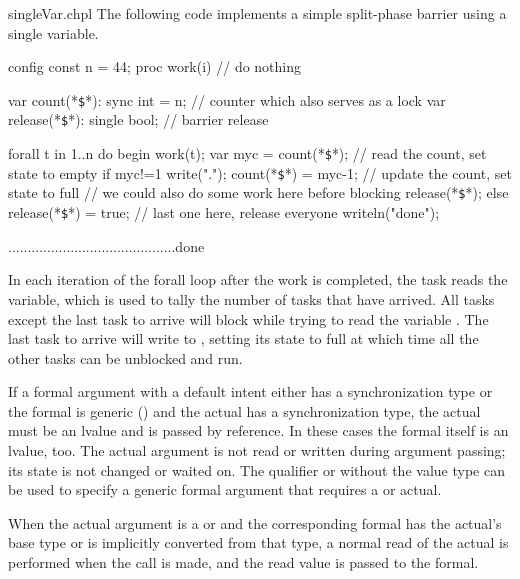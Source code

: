 \pagebreak
\begin{chapelexample}{singleVar.chpl}
The following code implements a simple split-phase barrier using a
single variable.
\begin{chapelpre}
config const n = 44;
proc work(i) {
  // do nothing
}
\end{chapelpre}
\begin{chapel}
var count(*\texttt{\$}*): sync int = n;  // counter which also serves as a lock
var release(*\texttt{\$}*): single bool; // barrier release

forall t in 1..n do begin {
  work(t);
  var myc = count(*\texttt{\$}*);  // read the count, set state to empty
  if myc!=1 {
    write(".");
    count(*\texttt{\$}*) = myc-1;  // update the count, set state to full
    // we could also do some work here before blocking
    release(*\texttt{\$}*);
  } else {
    release(*\texttt{\$}*) = true;  // last one here, release everyone
    writeln("done");
  }
}
\end{chapel}
\begin{chapeloutput}
...........................................done
\end{chapeloutput}
In each iteration of the forall loop after the work is completed, the
task reads the  variable, which is
used to tally the number of tasks that have arrived.  All tasks except
the last task to arrive will block while trying to read the
variable .  The last task to arrive
will write to , setting its state to
full at which time all the other tasks can be unblocked and run.
\end{chapelexample}

If a formal argument with a default intent either has a synchronization
type or the formal is generic ()
and the actual has a synchronization type, the actual must be an
lvalue and is passed by reference. In these cases the formal itself
is an lvalue, too. The actual argument is not read or written during
argument passing; its state is not changed or waited on. The qualifier
 or  without the value type can be used to
specify a generic formal argument that requires a 
or  actual.

When the actual argument is a  or  and the
corresponding formal has the actual's base type or is implicitly
converted from that type, a normal read of the actual is performed
when the call is made, and the read value is passed to the formal.



